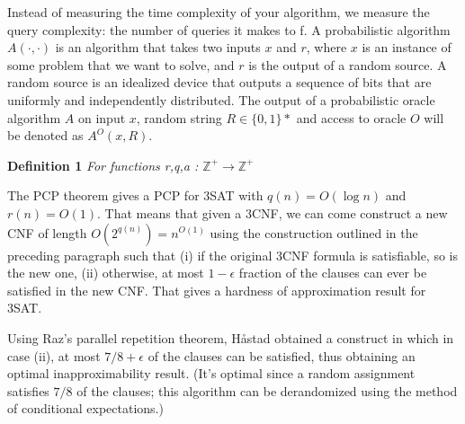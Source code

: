 Instead of measuring the time complexity of your algorithm, we measure the query complexity: the number of queries it makes to f. A probabilistic algorithm $A(·, ·)$ is an algorithm that takes two inputs $x$ and $r$, where $x$ is an instance of some problem that we want to solve, and $r$ is the output of a random source. A random source is an idealized device that outputs a sequence of bits that are uniformly and independently distributed. The output of a probabilistic oracle algorithm $A$ on input $x$, random string $R \in \{0,1\}*$ and access to oracle $O$ will be denoted as $A^O(x,R)$.

\textbf{Definition 1} \textit{For functions r,q,a : $\mathbb{Z}^+ \rightarrow \mathbb{Z}^+$}

The PCP theorem gives a PCP for 3SAT with $q(n) = O(\log n)$ and $r(n) = O(1)$. That means that given a 3CNF, we can come construct a new CNF of length $O(2^{q(n)}) = n^{O(1)}$ using the construction outlined in the preceding paragraph such that (i) if the original 3CNF formula is satisfiable, so is the new one, (ii) otherwise, at most $1-\epsilon$ fraction of the clauses can ever be satisfied in the new CNF. That gives a hardness of approximation result for 3SAT. 

Using Raz's parallel repetition theorem, Håstad obtained a construct in which in case (ii), at most $7/8+\epsilon$ of the clauses can be satisfied, thus obtaining an optimal inapproximability result. (It's optimal since a random assignment satisfies $7/8$ of the clauses; this algorithm can be derandomized using the method of conditional expectations.)
